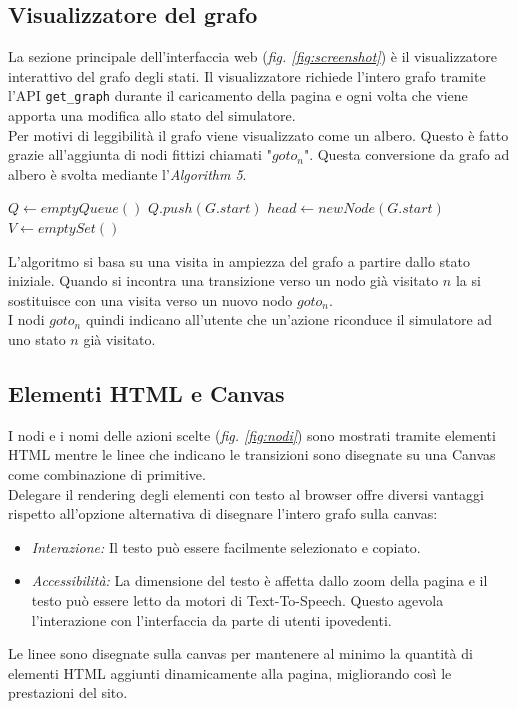 \documentclass[a4paper, 11pt, titlepage, twoside, openany]{book}
\begin{document}
\subsection{Visualizzatore del grafo}
La sezione principale dell'interfaccia web (\textit{fig. \ref{fig:screenshot}}) è il visualizzatore interattivo del grafo degli stati. Il visualizzatore richiede l'intero grafo tramite l'API \texttt{get\_graph} durante il caricamento della pagina e ogni volta che viene apporta una modifica allo stato del simulatore. \\
Per motivi di leggibilità il grafo viene visualizzato come un albero. Questo è fatto grazie all'aggiunta di nodi fittizi chiamati "$goto_n$".
Questa conversione da grafo ad albero è svolta mediante l'\textit{Algorithm 5}. \\
\begin{algorithm}
\caption{Aggiunta dei nodi $goto_n$}\label{alg:aggiunta_goto}
$Q \gets emptyQueue()$\;
$Q.push(G.start)$
$head \gets newNode(G.start)$\;
$V \gets emptySet()$
\end{algorithm}
L'algoritmo si basa su una visita in ampiezza del grafo a partire dallo stato iniziale. Quando si incontra una transizione verso un nodo già visitato $n$ la si sostituisce con una visita verso un nuovo nodo $goto_n$. \\
I nodi $goto_n$ quindi indicano all'utente che un'azione riconduce il simulatore ad uno stato $n$ già visitato.

\subsection{Elementi HTML e Canvas}
I nodi e i nomi delle azioni scelte (\textit{fig. \ref{fig:nodi}}) sono mostrati tramite elementi HTML mentre le linee che indicano le transizioni sono disegnate su una Canvas come combinazione di primitive. \\
Delegare il rendering degli elementi con testo al browser offre diversi vantaggi rispetto all'opzione alternativa di disegnare l'intero grafo sulla canvas:
\begin{itemize}
    \item \textit{Interazione:} Il testo può essere facilmente selezionato e copiato.
    \item \textit{Accessibilità:} La dimensione del testo è affetta dallo zoom della pagina e il testo può essere letto da motori di Text-To-Speech. Questo agevola l'interazione con l'interfaccia da parte di utenti ipovedenti. 
\end{itemize}
Le linee sono disegnate sulla canvas per mantenere al minimo la quantità di elementi HTML aggiunti dinamicamente alla pagina, migliorando così le prestazioni del sito.
\end{document}
